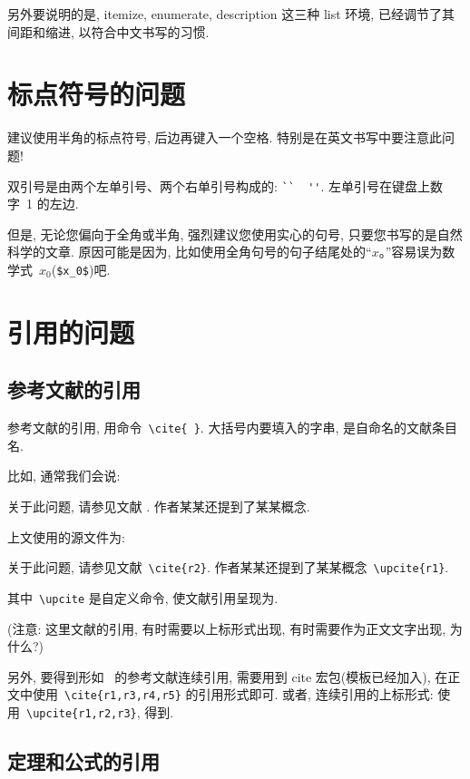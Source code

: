 \documentclass[forprint]{WHUBachelor}
\begin{document}
  另外要说明的是,  itemize, enumerate, description 这三种 list 环境, 已经调节了其间距和缩进,
  以符合中文书写的习惯.
  
  \section{标点符号的问题}
  
  建议使用半角的标点符号, 后边再键入一个空格. 特别是在英文书写中要注意此问题!
  
  双引号是由两个左单引号、两个右单引号构成的: \verb|``  ''|. 左单引号在键盘上数字~1 的左边.
  
  但是, 无论您偏向于全角或半角, 强烈建议您使用实心的句号, 只要您书写的是自然科学的文章.
  原因可能是因为, 比如使用全角句号的句子结尾处的``$x$。''容易误为数学式~$x_0$(\verb|$x_0$|)吧.
  
  
  
  \section{引用的问题}
  
  
  \subsection{参考文献的引用}
  
  参考文献的引用, 用命令~\verb|\cite{ }|. 大括号内要填入的字串, 是自命名的文献条目名.
  
  比如, 通常我们会说:
  
   {\kaishu
  关于此问题, 请参见文献 \cite{r2}. 作者某某还提到了某某概念.}
  
  
  上文使用的源文件为:
  
   {\kaishu
  关于此问题, 请参见文献~\verb|\cite{r2}|. 作者某某还提到了某某概念~\verb|\upcite{r1}|.
  }
  
  其中~\verb|\upcite| 是自定义命令, 使文献引用呈现为.
  
  ({\heiti 注意:} {\kaishu 这里文献的引用, 有时需要以上标形式出现, 有时需要作为正文文字出现, 为什么?})
  
  另外, 要得到形如~\cite{r1,r3,r4,r5} 的参考文献连续引用, 需要用到 cite 宏包(模板已经加入),
  在正文中使用~\verb|\cite{r1,r3,r4,r5}| 的引用形式即可.
  或者, 连续引用的上标形式: 使用~\verb|\upcite{r1,r2,r3}|, 得到.
  
  \subsection{定理和公式的引用}
  
\end{document}
